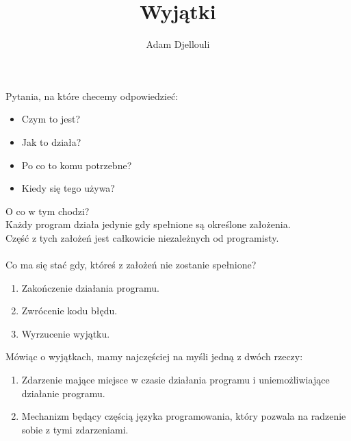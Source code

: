 \documentclass[notheorems, aspectratio=54]{beamer}
\title[Wyjątki]{Wyjątki}
\author{Adam Djellouli}
\begin{document}
\begin{frame}
	\titlepage
\end{frame}

\begin{frame}
	
	Pytania, na które checemy odpowiedzieć:
	
	\begin{itemize}
		\item Czym to jest?
		\item Jak to działa?
		\item Po co to komu potrzebne?
		\item Kiedy się tego używa?
	\end{itemize}
	
\end{frame}

\begin{frame}
	O co w tym chodzi?\\
	
	Każdy program działa jedynie gdy spełnione są określone założenia.\\
	Część z tych założeń jest całkowicie niezależnych od programisty.\\~\\
	Co ma się stać gdy, któreś z założeń nie zostanie spełnione?\\
	
	\begin{enumerate}
		\item Zakończenie działania programu.
		\item Zwrócenie kodu błędu.
		\item Wyrzucenie wyjątku.
	\end{enumerate}
	
\end{frame}

\begin{frame}
	
	Mówiąc o wyjątkach, mamy najczęściej na myśli jedną z dwóch rzeczy:
	
	\begin{enumerate}
		\item Zdarzenie mające miejsce w czasie działania programu i uniemożliwiające działanie programu.
		\item Mechanizm będący częścią języka programowania, który pozwala na radzenie sobie z tymi zdarzeniami.
	\end{enumerate}
	
\end{frame}
\end{document}
